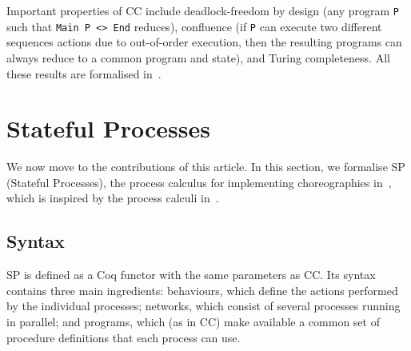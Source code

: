 \documentclass[runningheads]{llncs}
\begin{document}
Important properties of CC include deadlock-freedom by design (any program \lstinline+P+ such that
\lstinline+Main P <> End+ reduces), confluence (if \lstinline+P+ can execute two different
sequences actions due to out-of-order execution, then the resulting programs can always reduce to a
common program and state), and Turing completeness.
All these results are formalised in~\cite{CMP21}.



\section{Stateful Processes}
\label{sec:sp}

We now move to the contributions of this article. In this section, we formalise SP (Stateful Processes), the process calculus for implementing choreographies in~\cite{M21itc}, which is inspired by the process calculi in~\cite{CM17,CM20}.

\subsection{Syntax}
SP is defined as a Coq functor with the same parameters as CC.
Its syntax contains three main ingredients: behaviours, which define the actions performed by the individual processes; networks, which consist of several processes running in parallel; and
programs, which (as in CC) make available a common set of procedure definitions that each process
can use.
\end{document}
